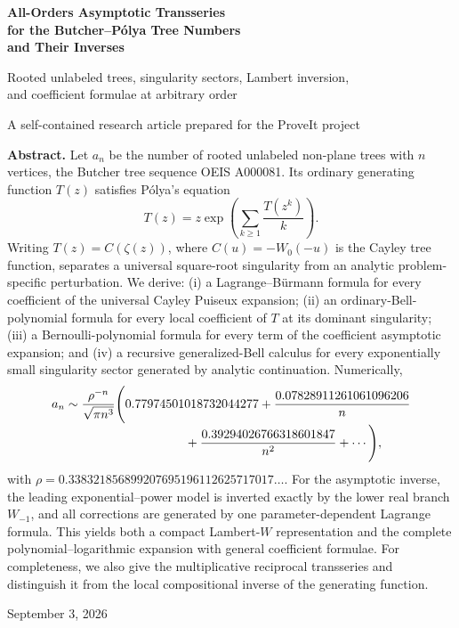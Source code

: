 \documentclass[11pt]{article}
\theoremstyle{definition}
\theoremstyle{remark}
\begin{document}
\hypersetup{pageanchor=false}

\begin{titlepage}
\centering
\vspace*{18mm}
{\Huge\bfseries\color{deepblue}
All-Orders Asymptotic Transseries\\[2mm]
for the Butcher--P\'olya Tree Numbers\\[2mm]
and Their Inverses\par}
\vspace{10mm}
{\Large Rooted unlabeled trees, singularity sectors, Lambert inversion,\\
and coefficient formulae at arbitrary order\par}
\vspace{16mm}
{\large A self-contained research article prepared for the ProveIt project\par}
\vfill
\begin{minipage}{0.89\textwidth}
\small
\textbf{Abstract.}
Let $a_n$ be the number of rooted unlabeled non-plane trees with $n$ vertices,
the Butcher tree sequence OEIS A000081.  Its ordinary generating function
$T(z)$ satisfies P\'olya's equation
\[
T(z)=z\exp\!\left(\sum_{k\geq1}\frac{T(z^k)}{k}\right).
\]
Writing $T(z)=C(\zeta(z))$, where $C(u)=-W_0(-u)$ is the Cayley tree
function, separates a universal square-root singularity from an analytic
problem-specific perturbation.  We derive: (i) a Lagrange--B\"urmann formula
for every coefficient of the universal Cayley Puiseux expansion; (ii) an
ordinary-Bell-polynomial formula for every local coefficient of $T$ at its
dominant singularity; (iii) a Bernoulli-polynomial formula for every term of
the coefficient asymptotic expansion; and (iv) a recursive generalized-Bell
calculus for every exponentially small singularity sector generated by
analytic continuation.  Numerically,
\[
\begin{aligned}
 a_n&\sim \frac{\rho^{-n}}{\sqrt{\pi n^3}}
 \Biggl(0.77974501018732044277
 +\frac{0.07828911261061096206}{n}\\[-1mm]
 &\hspace{34mm}
 +\frac{0.39294026766318601847}{n^2}+\cdots\Biggr),
\end{aligned}
\]
with
$\rho=0.338321856899207695196112625717017\ldots$.
For the asymptotic inverse, the leading exponential--power model is inverted
exactly by the lower real branch $W_{-1}$, and all corrections are generated
by one parameter-dependent Lagrange formula.  This yields both a compact
Lambert-$W$ representation and the complete polynomial--logarithmic expansion
with general coefficient formulae.  For completeness, we also give the
multiplicative reciprocal transseries and distinguish it from the local
compositional inverse of the generating function.
\end{minipage}
\vfill
{\large September 3, 2026\par}
\end{titlepage}
\hypersetup{pageanchor=true}
\end{document}

